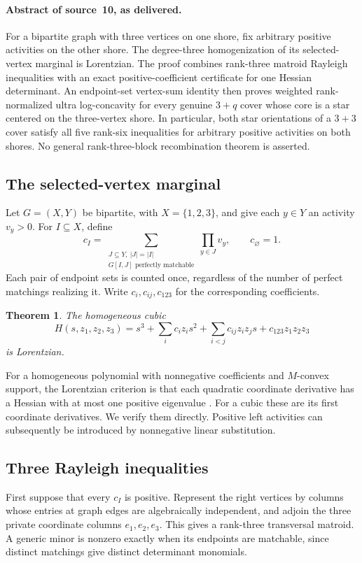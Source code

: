 \documentclass[11pt,a4paper]{article}
\newtheorem{theorem}{Theorem}[section]
\theoremstyle{remark}\newtheorem{remark}[theorem]{Remark}
\begin{document}
\paragraph{Abstract of source~10, as delivered.} For a bipartite graph with three vertices on one shore, fix arbitrary positive
activities on the other shore. The degree-three homogenization of its selected-vertex
marginal is Lorentzian. The proof combines rank-three matroid Rayleigh inequalities
with an exact positive-coefficient certificate for one Hessian determinant.
An endpoint-set vertex-sum identity then proves weighted rank-normalized ultra
log-concavity for every genuine $3+q$ cover whose core is a star centered on the
three-vertex shore. In particular, both star orientations of a $3+3$ cover satisfy
all five rank-six inequalities for arbitrary positive activities on both shores.
No general rank-three-block recombination theorem is asserted.

\subsection{The selected-vertex marginal}
Let $G=(X,Y)$ be bipartite, with $X=\{1,2,3\}$, and give each $y\in Y$ an
activity $v_y>0$. For $I\subseteq X$, define
\[
 c_I=\sum_{\substack{J\subseteq Y,\ |J|=|I|\\
                    G[I,J]\text{ perfectly matchable}}}\prod_{y\in J}v_y,
 \qquad c_\varnothing=1.
\]
Each pair of endpoint sets is counted once, regardless of the number of
perfect matchings realizing it. Write $c_i,c_{ij},c_{123}$ for the corresponding
coefficients.

\begin{theorem}\label{mrn:s:tv:thm:marginal}
The homogeneous cubic
\begin{equation}\label{mrn:s:tv:eq:H}
 H(s,z_1,z_2,z_3)=s^3+\sum_i c_i z_i s^2+
       \sum_{i<j}c_{ij}z_i z_j s+c_{123}z_1z_2z_3
\end{equation}
is Lorentzian.
\end{theorem}

For a homogeneous polynomial with nonnegative coefficients and $M$-convex
support, the Lorentzian criterion is that each quadratic coordinate derivative
has a Hessian with at most one positive eigenvalue \cite[Theorem 2.25]{b:BH}.
For a cubic these are its first coordinate derivatives. We verify them directly.
Positive left activities can subsequently be introduced by nonnegative
linear substitution.

\subsection{Three Rayleigh inequalities}
First suppose that every $c_I$ is positive. Represent the right vertices by
columns whose entries at graph edges are algebraically independent, and adjoin
the three private coordinate columns $e_1,e_2,e_3$. This gives a rank-three
transversal matroid. A generic minor is nonzero exactly when its endpoints
are matchable, since distinct matchings give distinct determinant monomials.
\end{document}
